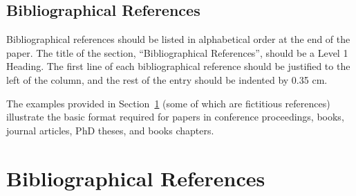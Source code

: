 \documentclass[10pt, a4paper]{article}
\begin{document}
\subsection{Bibliographical References} 

Bibliographical references should be listed in alphabetical order at the end of the paper. The title of the section, ``Bibliographical References'', should be a Level 1 Heading. The first line of each bibliographical reference should be justified to the left of the column, and the rest of the entry should be indented by 0.35 cm.

The examples provided in Section~\ref{sec:reference} (some of which are fictitious references) illustrate the basic format required for papers in conference proceedings, books, journal articles, PhD theses, and books chapters.


\nocite{*}
\section{Bibliographical References}\label{sec:reference}



\end{document}
